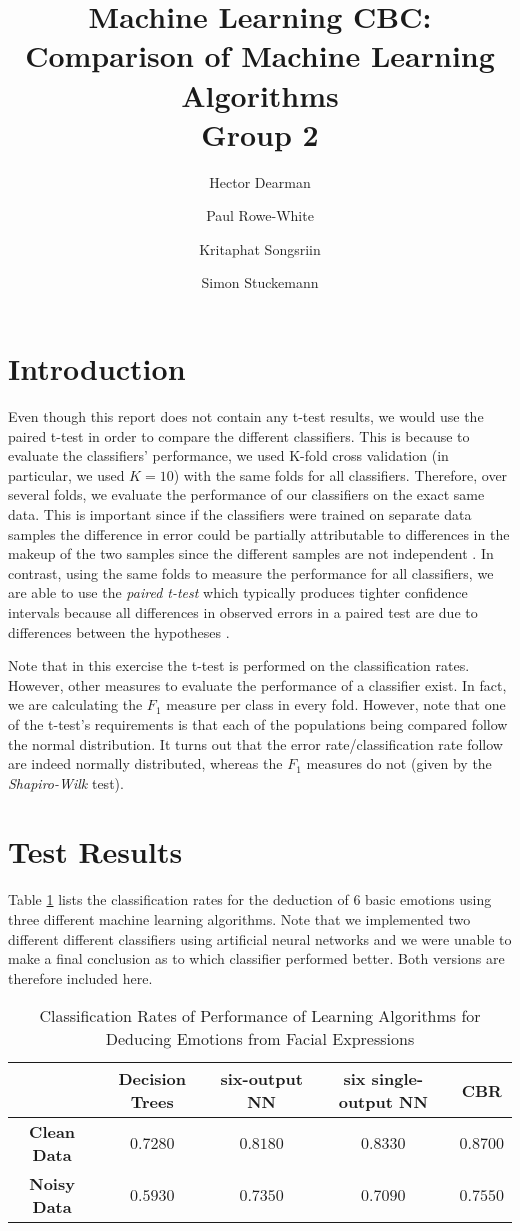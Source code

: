 \documentclass[10pt,a4paper]{article}
\author{Hector Dearman \and Paul Rowe-White \and Kritaphat Songsriin \and Simon Stuckemann}
\title{Machine Learning CBC: Comparison of Machine Learning Algorithms\\Group 2}
\begin{document}
\maketitle

\section{Introduction}
Even though this report does not contain any t-test results, we would use the paired t-test in order to compare the different classifiers. This is because to evaluate the classifiers' performance, we used K-fold cross validation (in particular, we used $K=10$) with the same folds for all classifiers. Therefore, over several folds, we evaluate the performance of our classifiers on the exact same data. This is important since if the classifiers were trained on separate data samples the difference in error could be partially attributable to differences in the makeup of the two samples since the different samples are not independent \cite{Mitchell:1997:ML:541177}. In contrast, using the same folds to measure the performance for all classifiers, we are able to use the \emph{paired t-test} which typically produces tighter confidence intervals because all differences in observed errors in a paired test are due to differences between the hypotheses \cite{Mitchell:1997:ML:541177}.

Note that in this exercise the t-test is performed on the classification rates. However, other measures to evaluate the performance of a classifier exist. In fact, we are calculating the $F_1$ measure per class in every fold. However, note that one of the t-test's requirements is that each of the populations being compared follow the normal distribution. It turns out that the error rate/classification rate follow are indeed normally distributed, whereas the $F_1$ measures do not (given by the \emph{Shapiro-Wilk} test).

\section{Test Results}
Table \ref{tab:classificationRates} lists the classification rates for the deduction of 6 basic emotions using three different machine learning algorithms. Note that we implemented two different different classifiers using artificial neural networks and we were unable to make a final conclusion as to which classifier performed better. Both versions are therefore included here.
\begin{table}[!ht]
\centering
\begin{tabular}{|c|c|c|c|c|}
\hline 
 & \textbf{Decision Trees} & \textbf{six-output NN} & \textbf{six single-output NN} & \textbf{CBR} \\ 
\hline 
\textbf{Clean Data} & $0.7280$ & $0.8180$ & $0.8330$ &  $0.8700$\\ 
\hline 
\textbf{Noisy Data} & $0.5930$ & $0.7350$ & $0.7090$ &  $0.7550$\\ 
\hline 
\end{tabular}
\caption{Classification Rates of Performance of Learning Algorithms for Deducing Emotions from Facial Expressions}
\label{tab:classificationRates}
\end{table}
\end{document}
